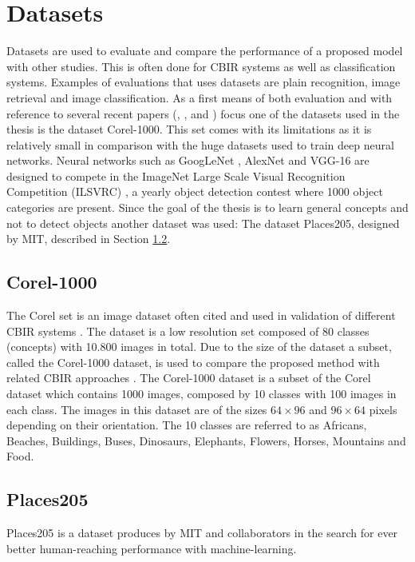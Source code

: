 \section{Datasets}
\label{sec:theory:datasets}
Datasets are used to evaluate and compare the performance of a proposed model with other studies. This is often done for CBIR systems as well as classification systems.
Examples of evaluations that uses datasets are plain recognition, image retrieval and image classification. 
As a first means of both evaluation and with reference to several recent papers (\cite{wang2001simplicity}, \cite{subrahmanyam2013modified}, \cite{nagaraja2015low} and \cite{elalami2014new}) focus one of the datasets used in the thesis is the dataset Corel-1000. 
This set comes with its limitations as it is relatively small in comparison with the huge datasets used to train deep neural networks. Neural networks such as GoogLeNet \cite{szegedy2015going}, AlexNet \cite{krizhevsky2012imagenet} and VGG-16 \cite{simonyan2014very} are designed to compete in the ImageNet Large Scale Visual Recognition Competition (ILSVRC) \cite{russakovsky2015imagenet}, a yearly object detection contest where 1000 object categories are present. Since the goal of the thesis is to learn general concepts and not to detect objects another dataset was used: The dataset Places205, designed by MIT, described in Section \ref{sec:theory:dataset:places}.   


\subsection{Corel-1000}
\label{sec:corel}
The Corel set is an image dataset often cited and used in validation of different CBIR systems \cite{coreldataset2017}. The dataset is a low resolution set composed of 80 classes (concepts) with 10.800 images in total. Due to the size of the dataset a subset, called the Corel-1000 dataset, is used to compare the proposed method with related CBIR approaches \cite{wang2001simplicity}. The Corel-1000 dataset is a subset of the Corel dataset which contains 1000 images, composed by 10 classes with 100 images in each class. The images in this dataset are of the sizes $64\times96$ and $96\times64$ pixels depending on their orientation. The 10 classes are referred to as Africans, Beaches, Buildings, Buses, Dinosaurs, Elephants, Flowers, Horses, Mountains and Food. 

\subsection{Places205}
\label{sec:theory:dataset:places}
Places205 is a dataset produces by MIT and collaborators in the search for ever better human-reaching performance with machine-learning. 

